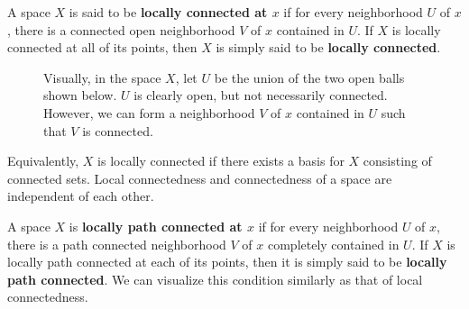   \begin{definition}
    A space $X$ is said to be \textbf{locally connected at $x$} if for every neighborhood $U$ of $x$, there is a connected open neighborhood $V$ of $x$ contained in $U$. If $X$ is locally connected at all of its points, then $X$ is simply said to be \textbf{locally connected}. 

    \begin{figure}[H]
      \centering 
      \caption{Visually, in the space $X$, let $U$ be the union of the two open balls shown below. $U$ is clearly open, but not necessarily connected. However, we can form a  neighborhood $V$ of $x$ contained in $U$ such that $V$ is connected. }
      \label{fig:locally_connected}
    \end{figure}
  \end{definition}

  Equivalently, $X$ is locally connected if there exists a basis for $X$ consisting of connected sets. Local connectedness and connectedness of a space are independent of each other. 

  \begin{definition}
    A space $X$ is \textbf{locally path connected at $x$} if for every neighborhood $U$ of $x$, there is a path connected neighborhood $V$ of $x$ completely contained in $U$. If $X$ is locally path connected at each of its points, then it is simply said to be \textbf{locally path connected}. We can visualize this condition similarly as that of local connectedness. 
  \end{definition}

